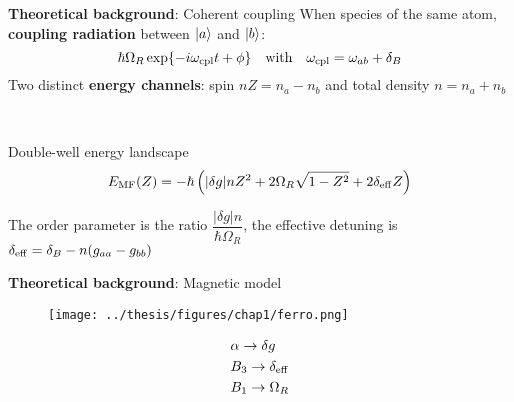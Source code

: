 \documentclass[aspectratio=169]{beamer}
\begin{document}

\begin{frame}{\textbf{Theoretical background}: Coherent coupling}
  When species of the same atom, \textbf{coupling radiation} between $\ket{a}$ and $\ket{b}$:
  \[
      \hbar\Omega_R\exp{-i\omega_{\rm cpl}t+\phi} \quad \text{with} \quad \omega_{\rm cpl} = \omega_{ab} + \delta_B
  \]
  Two distinct \textbf{energy channels}: spin $nZ = n_a-n_b$ and total density $n = n_a+n_b$
  \pause

  ~

  Double-well energy landscape
  \begin{equation*}
      E_{\rm MF}(Z) = -\hbar\left(|\delta g|n Z^2 + 2\Omega_R \sqrt{1-Z^2} + 2\delta_{\rm eff} Z\right)
      \label{eq:E_MF}
  \end{equation*}

  The order parameter is the ratio $\dfrac{|\delta g|n}{\hbar\Omega_R}$, the effective detuning is $\delta_{\rm eff} = \delta_B - n(g_{aa}-g_{bb})$
\end{frame}

\begin{frame}{\textbf{Theoretical background}: Magnetic model}
  \begin{minipage}{0.7\textwidth}
    \begin{figure}
      \centering
      \texttt{[image: ../thesis/figures/chap1/ferro.png]}
    \end{figure} 
  \end{minipage}
  \hspace{0.01\textwidth}
  \begin{minipage}{0.27\textwidth}
    \begin{align*}
      &\alpha\to\delta g\\
      &B_3\to\delta_{\rm eff}\\
      &B_1\to\Omega_R
    \end{align*}
  \end{minipage}
\end{frame} 
\end{document}
